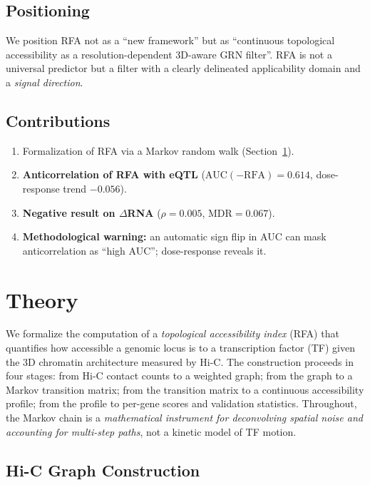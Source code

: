 \documentclass[11pt,a4paper]{article}
\begin{document}
\subsection{Positioning}
We position RFA not as a ``new framework'' but as ``continuous topological accessibility as a resolution-dependent 3D-aware GRN filter''. RFA is not a universal predictor but a filter with a clearly delineated applicability domain and a \emph{signal direction}.

\subsection{Contributions}
\begin{enumerate}
    \item Formalization of RFA via a Markov random walk (Section~\ref{sec:theory}).
    \item \textbf{Anticorrelation of RFA with eQTL} ($\mathrm{AUC}(-\mathrm{RFA})=0.614$, dose-response trend $-0.056$).
    \item \textbf{Negative result on $\Delta$RNA} ($\rho=0.005$, MDR$=0.067$).
    \item \textbf{Methodological warning:} an automatic sign flip in AUC can mask anticorrelation as ``high AUC''; dose-response reveals it.
\end{enumerate}

\section{Theory}\label{sec:theory}

We formalize the computation of a \emph{topological accessibility index} (RFA) that quantifies how accessible a genomic locus is to a transcription factor (TF) given the 3D chromatin architecture measured by Hi-C. The construction proceeds in four stages: from Hi-C contact counts to a weighted graph; from the graph to a Markov transition matrix; from the transition matrix to a continuous accessibility profile; from the profile to per-gene scores and validation statistics. Throughout, the Markov chain is a \emph{mathematical instrument for deconvolving spatial noise and accounting for multi-step paths}, not a kinetic model of TF motion.

\subsection{Hi-C Graph Construction}
\end{document}
